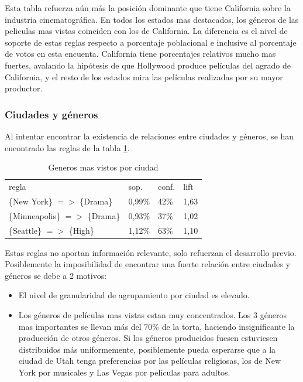 \documentclass[journal]{IEEEtran}
\begin{document}
Esta tabla refuerza aún más la posición dominante que tiene California sobre la industria
cinematográfica. En todos los estados mas destacados, los géneros de 
las peliculas mas vistas coinciden con los de California. La diferencia es el nivel de
soporte de estas reglas respecto a porcentaje poblacional e inclusive al porcentaje de
votos en esta encuenta. California tiene porcentajes relativos mucho mas fuertes, avalando
la hipótesis de que Hollywood produce películas del agrado de California, y el resto de
los estados mira las películas realizadas por su mayor productor.


\subsubsection{Ciudades y géneros}
Al intentar encontrar la existencia de relaciones entre ciudades y géneros, se
han encontrado las reglas de la tabla \ref{citi_genre}.

\begin{table}[ht!]
\caption{Generos mas vistos por ciudad}
\label{citi_genre}
\centering
\begin{tabular}{l l l l }
regla & sop. & conf. & lift \\
\{New York\} $=$$>$ \{Drama\} & 0,99\% & 42\% & 1,63 \\
\{Minneapolis\} $=$$>$ \{Drama\} & 0,93\% & 37\% & 1,02 \\
\{Seattle\} $=$$>$ \{High\} & 1,12\% & 63\% & 1,10 \\
\end{tabular}
\end{table}

Estas reglas no aportan información relevante, solo refuerzan el desarrollo
previo. Posiblemente la imposibilidad de encontrar una fuerte relación entre
ciudades y géneros se debe a 2 motivos:
\begin{itemize}
\item El nivel de granularidad de agrupamiento por ciudad es elevado.
\item Los géneros de películas mas vistas estan muy concentrados. Los 3 géneros
mas importantes se llevan más del 70\% de la torta, haciendo insignificante la
producción de otros géneros. Si los géneros producidos fuesen estuviesen
distribuidos más uniformemente, 
posiblemente pueda esperarse que a la ciudad de Utah tenga preferencias por las
películas religiosas, los de New York por musicales y Las Vegas por películas 
para adultos.
\end{itemize}
\end{document}
